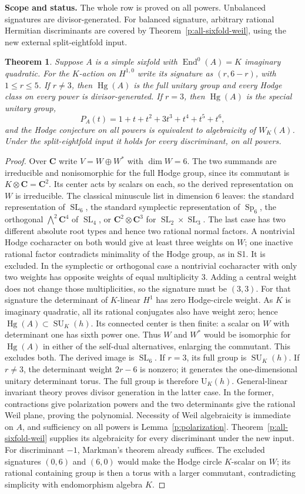 \documentclass[11pt,reqno]{article}
\theoremstyle{emphasizedplain}
\newtheorem{theorem}{Theorem}[section]
\theoremstyle{emphasizeddefinition}
\theoremstyle{emphasizeddefinition}
\DeclareMathOperator{\End}{End}
\DeclareMathOperator{\Hg}{Hg}
\DeclareMathOperator{\Sp}{Sp}
\DeclareMathOperator{\SL}{SL}
\DeclareMathOperator{\SU}{SU}
\newcommand{\C}{\mathbf C}
\newcommand{\status}[1]{%
  \par\nobreak\smallskip\noindent
  {\setlength{\fboxsep}{7pt}%
   \colorbox{ScopeBackground}{%
    \parbox{\dimexpr\linewidth-2\fboxsep\relax}{%
     \small\textbf{\textcolor{HeadingInk}{Scope and status.}} #1}}}%
  \par\nobreak\medskip}
\begin{document}
\status{The whole row is proved on all powers. Unbalanced signatures
are divisor-generated. For balanced signature, arbitrary rational
Hermitian discriminants are covered by Theorem~\ref{p:all-sixfold-weil},
using the new external split-eightfold input.}
\begin{theorem}\label{t:S8}
Suppose $A$ is a simple sixfold with $\End^0(A)=K$ imaginary quadratic.
For the $K$-action on $H^{1,0}$ write its signature as $(r,6-r)$, with
$1\leq r\leq5$. If $r\ne3$, then $\Hg(A)$ is the full unitary group
and every Hodge class on every power is divisor-generated.
If $r=3$, then $\Hg(A)$ is the special unitary group,
\[
 P_A(t)=1+t+t^2+3t^3+t^4+t^5+t^6,
\]
and the Hodge conjecture on all powers is equivalent to algebraicity of
$W_K(A)$. Under the split-eightfold input it holds for every
discriminant, on all powers.
\end{theorem}
\begin{proof}
Over $\C$ write $V=W\oplus W^*$ with $\dim W=6$. The two summands are
irreducible and nonisomorphic for the full Hodge group, since its commutant
is $K\otimes\C=\C^2$. Its center acts by scalars on each, so the derived
representation on $W$ is irreducible.
The classical minuscule list in dimension $6$ leaves: the standard
representation of $\SL_6$, the standard symplectic representation of
$\Sp_6$, the orthogonal $\bigwedge^2\C^4$ of $\SL_4$, or
$\C^2\otimes\C^3$ for $\SL_2\times\SL_3$.
The last case has two different absolute root types and hence two rational
normal factors. A nontrivial Hodge cocharacter on both would give at least
three weights on $W$; one inactive rational factor contradicts minimality
of the Hodge group, as in S1. It is excluded.
In the symplectic or orthogonal case a nontrivial cocharacter with only
two weights has opposite weights of equal multiplicity $3$. Adding a
central weight does not change those multiplicities, so the signature must
be $(3,3)$. For that signature the determinant of $K$-linear $H^1$ has zero
Hodge-circle weight. As $K$ is imaginary quadratic, all its rational
conjugates also have weight zero; hence $\Hg(A)\subset\SU_K(h)$.
Its connected center is then finite: a scalar on $W$ with determinant one
has sixth power one. Thus $W$ and $W^*$ would be isomorphic for $\Hg(A)$
in either of the self-dual alternatives, enlarging the commutant. This
excludes both. The derived image is $\SL_6$.
If $r=3$, its full group is $\SU_K(h)$. If $r\ne3$, the determinant weight
$2r-6$ is nonzero; it generates the one-dimensional unitary determinant
torus. The full group is therefore $\mathrm U_K(h)$.
General-linear invariant theory proves divisor generation in the latter
case. In the former, contractions give polarization powers and the two
determinants give the rational Weil plane, proving the polynomial.
Necessity of Weil algebraicity is immediate on $A$, and sufficiency on all
powers is Lemma~\ref{p:polarization}. Theorem~\ref{p:all-sixfold-weil}
supplies its algebraicity for every discriminant under the new input.
For discriminant $-1$, Markman's theorem already suffices.
The excluded signatures $(0,6)$ and $(6,0)$ would make the Hodge circle
$K$-scalar on $W$; its rational containing group is then a torus with a
larger commutant, contradicting simplicity with endomorphism algebra $K$.
\end{proof}
\end{document}
